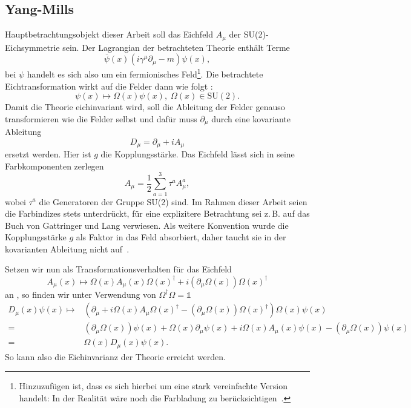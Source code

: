 \subsection{Yang-Mills}
Hauptbetrachtungsobjekt dieser Arbeit soll das Eichfeld $A_\mu$ der
SU(2)-Eichsymmetrie sein. Der Lagrangian der betrachteten Theorie enthält 
Terme
\[
    \overline{\psi}(x)(i \gamma^\mu \partial_\mu - m) \psi(x),
\]
bei $\psi$ handelt es sich also um ein fermionisches Feld\footnote{Hinzuzufügen
ist, dass es sich hierbei um eine stark vereinfachte Version handelt: In der
Realität wäre noch die Farbladung zu berücksichtigen~\cite{gattringerLang}.}.
Die betrachtete Eichtransformation wirkt auf die Felder dann wie folgt
\cite{gattringerLang}:
\[
    \psi(x) \mapsto \Omega(x) \psi(x), \; \Omega(x) \in \mathrm{SU}(2).
\]
Damit die Theorie eichinvariant wird, soll die Ableitung der Felder genauso
transformieren wie die Felder selbst und dafür muss $\partial_\mu$
durch eine kovariante Ableitung
\[
D_\mu = \partial_\mu + i A_\mu
\]
ersetzt werden. Hier ist $g$ die Kopplungsstärke. Das Eichfeld lässt sich in
seine Farbkomponenten zerlegen \cite{gattringerLang}
\[
    A_\mu = \frac{1}{2} \sum_{a = 1}^3 \tau^a A_\mu^a,
\]
wobei $\tau^a$ die Generatoren der Gruppe SU(2) sind. Im Rahmen dieser Arbeit
seien die Farbindizes stets unterdrückt, für eine explizitere Betrachtung sei
z.\,B. auf das Buch von Gattringer und Lang \cite{gattringerLang} verwiesen.
Als weitere Konvention wurde die Kopplungsstärke $g$ als Faktor in das Feld
absorbiert, daher taucht sie in der kovarianten Ableitung nicht
auf~\cite{gattringerLang}. 

Setzen wir nun als Transformationsverhalten für das Eichfeld
\[
    A_\mu(x) \mapsto \Omega(x) A_\mu(x) \Omega(x)^\dag
    + i \left( \partial_\mu \Omega(x) \right) \Omega(x)^\dag
\]
an \cite{gattringerLang}, so finden wir unter Verwendung von
$\Omega^\dag \Omega = \mathds{1}$
\begin{align*}
    D_\mu(x) \psi(x) \mapsto
    &\left( \partial_\mu + i \Omega(x) A_\mu \Omega(x)^\dag
    - \left( \partial_\mu \Omega(x) \right) \Omega(x)^\dag \right)
    \Omega(x) \psi(x)\\
    = &\left( \partial_\mu \Omega(x) \right) \psi(x)
    + \Omega(x) \partial_\mu \psi(x) + i \Omega(x) A_\mu(x) \psi(x)
    - \left( \partial_\mu \Omega(x) \right) \psi(x) \\
    = &\Omega(x) D_\mu(x) \psi(x).
\end{align*}
So kann also die Eichinvarianz der Theorie erreicht werden.

